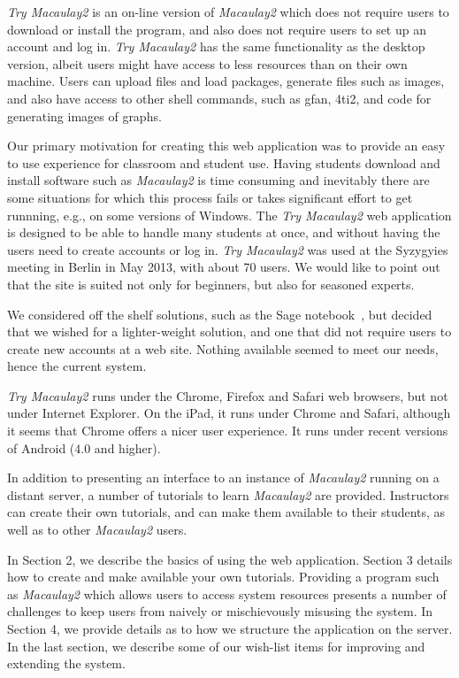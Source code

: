 \documentclass[]{article}
\def\tryM2{{\it Try Macaulay2}}
\def\M2{{\it Macaulay2}}
\begin{document}
\tryM2 is an on-line version of \M2 \cite{M2} which
does not require users to download or install the program, and also
does not require users to set up an account and log in.  \tryM2
has the same functionality as the desktop version,
albeit users might have access to less resources
than on their own machine. Users can upload files and
load packages, generate files such as images, and also have
access to other shell commands, such as gfan, 4ti2, and code for
generating images of graphs.

Our primary motivation for creating this web application was to
provide an easy to use experience for classroom and student use.
Having students download and install software such as \M2 is time
consuming and inevitably there are some situations for which this
process fails or takes significant effort to get runnning, e.g., on
some versions of Windows.  The \tryM2 web application is designed to
be able to handle many students at once, and without having the users
need to create accounts or log in.  \tryM2 was used at the Syzygyies
meeting in Berlin in May 2013, with about 70 users.  We would like to point out that the
site is suited not only for beginners, but also for seasoned experts.

We considered off the shelf solutions, such as the Sage
notebook~\cite{sagenotebook}, but decided that we wished for a
lighter-weight solution, and one that did not require users to create
new accounts at a web site.  Nothing available seemed to meet our
needs, hence the current system.

\tryM2 runs under the Chrome, Firefox and Safari web browsers, but not
under Internet Explorer.  On the iPad, it runs under Chrome and
Safari, although it seems that Chrome offers a nicer user experience.
It runs under recent versions of Android ($4.0$ and higher).

In addition to presenting an interface to an instance of \M2
running on a distant server, a number of tutorials to
learn \M2 are provided.  Instructors can create their own
tutorials, and can make them available to their students, as well as
to other \M2 users.  

In Section 2, we describe the basics of using the web application.
Section 3 details how to create and make available your own tutorials.
Providing a program such as \M2 which allows users to
access system resources presents a number of challenges to keep users
from naively or mischievously misusing the system.  In Section 4, we
provide details as to how we structure the application on the server.
In the last section, we describe some of our wish-list items for
improving and extending the system.
\end{document}
